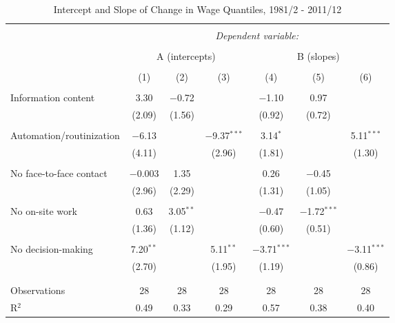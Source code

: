 

\begin{sidewaystable}[!htbp] \centering 
  \caption{Intercept and Slope of Change in Wage Quantiles, 1981/2 - 2011/12} 
  \label{} 
\begin{tabular}{@{\extracolsep{0pt}}lcccccc} 
\\[-1.8ex]\hline 
\hline \\[-1.8ex] 
 & \multicolumn{6}{c}{\textit{Dependent variable:}} \\ 
\cline{2-7} 
\\[-1.8ex] & \multicolumn{3}{c}{A (intercepts)} & \multicolumn{3}{c}{B (slopes)} \\ 
\\[-1.8ex] & (1) & (2) & (3) & (4) & (5) & (6)\\ 
\hline \\[-1.8ex] 
 Information content & 3.30 & $-$0.72 &  & $-$1.10 & 0.97 &  \\ 
  & (2.09) & (1.56) &  & (0.92) & (0.72) &  \\ 
  & & & & & & \\ 
 Automation/routinization & $-$6.13 &  & $-$9.37$^{***}$ & 3.14$^{*}$ &  & 5.11$^{***}$ \\ 
  & (4.11) &  & (2.96) & (1.81) &  & (1.30) \\ 
  & & & & & & \\ 
 No face-to-face contact & $-$0.003 & 1.35 &  & 0.26 & $-$0.45 &  \\ 
  & (2.96) & (2.29) &  & (1.31) & (1.05) &  \\ 
  & & & & & & \\ 
 No on-site work & 0.63 & 3.05$^{**}$ &  & $-$0.47 & $-$1.72$^{***}$ &  \\ 
  & (1.36) & (1.12) &  & (0.60) & (0.51) &  \\ 
  & & & & & & \\ 
 No decision-making & 7.20$^{**}$ &  & 5.11$^{**}$ & $-$3.71$^{***}$ &  & $-$3.11$^{***}$ \\ 
  & (2.70) &  & (1.95) & (1.19) &  & (0.86) \\ 
  & & & & & & \\ 
\hline \\[-1.8ex] 
Observations & 28 & 28 & 28 & 28 & 28 & 28 \\ 
R$^{2}$ & 0.49 & 0.33 & 0.29 & 0.57 & 0.38 & 0.40 \\ 

\end{tabular}
\end{sidewaystable}
